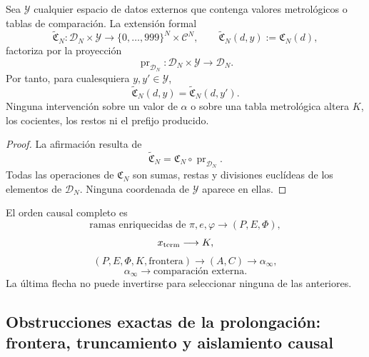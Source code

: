 \begin{theorem}
\label{p3-83-c25-s5:thm:no-interferencia-metrologica-alpha}
Sea \(\mathscr Y\) cualquier espacio de datos externos que contenga valores
metrológicos o tablas de comparación. La extensión formal
\[
 \widetilde{\mathfrak C}_N:
 \mathscr D_N\times\mathscr Y
 \longrightarrow
 \{0,\ldots,999\}^{N}\times\mathcal C^{N},
 \qquad
 \widetilde{\mathfrak C}_N(d,y):=\mathfrak C_N(d),
\]
factoriza por la proyección
\[
 \operatorname{pr}_{\mathscr D_N}:
 \mathscr D_N\times\mathscr Y\longrightarrow\mathscr D_N.
\]
Por tanto, para cualesquiera \(y,y'\in\mathscr Y\),
\[
 \widetilde{\mathfrak C}_N(d,y)
 =\widetilde{\mathfrak C}_N(d,y').
\]
Ninguna intervención sobre un valor de \(\alpha\) o sobre una tabla
metrológica altera \(K\), los cocientes, los restos ni el prefijo producido.
\end{theorem}

\begin{proof}
La afirmación resulta de
\[
 \widetilde{\mathfrak C}_N
 =\mathfrak C_N\circ\operatorname{pr}_{\mathscr D_N}.
\]
Todas las operaciones de \(\mathfrak C_N\) son sumas, restas y divisiones
euclídeas de los elementos de \(\mathscr D_N\). Ninguna coordenada de
\(\mathscr Y\) aparece en ellas.
\end{proof}

El orden causal completo es
\[
 \text{ramas enriquecidas de }\pi,e,\varphi
 \longrightarrow(P,E,\Phi),
\]
\[
 x_{\rm term}\longrightarrow K,
\]
\[
 (P,E,\Phi,K,\text{frontera})
 \longrightarrow(A,C)
 \longrightarrow\alpha_\infty,
\]
\[
 \alpha_\infty
 \longrightarrow\text{comparación externa}.
\]
La última flecha no puede invertirse para seleccionar ninguna de las
anteriores.

\subsection{Obstrucciones exactas de la prolongación: frontera, truncamiento y aislamiento causal}

